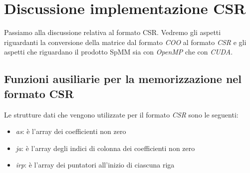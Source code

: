 \documentclass{article}
\begin{document}
\section{Discussione implementazione CSR}
Passiamo alla discussione relativa al formato CSR. Vedremo gli aspetti riguardanti la conversione della matrice dal formato \textit{COO} al formato \textit{CSR} e gli aspetti che riguardano il prodotto SpMM sia con \textit{OpenMP} che con \textit{CUDA}.

\subsection{Funzioni ausiliarie per la memorizzazione nel formato CSR}
Le strutture dati che vengono utilizzate per il formato \textit{CSR} sono le seguenti:

\begin{itemize}
\item \textit{as}: è l'array dei coefficienti non zero
\item \textit{ja}: è l'array degli indici di colonna dei coefficienti non zero
\item \textit{irp}: è l'array dei puntatori all'inizio di ciascuna riga
\end{itemize}
\end{document}
